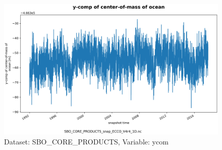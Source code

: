 \begin{figure}[H]
\centering
\includegraphics[scale=0.55]{../images/plots/oneD_plots/SBO_Core_Products/ycom.png}
\caption{Dataset: SBO\_CORE\_PRODUCTS, Variable: ycom}
\label{tab:table-SBO_CORE_PRODUCTS_ycom-Plot}
\end{figure}
\newpage
\pagebreak
